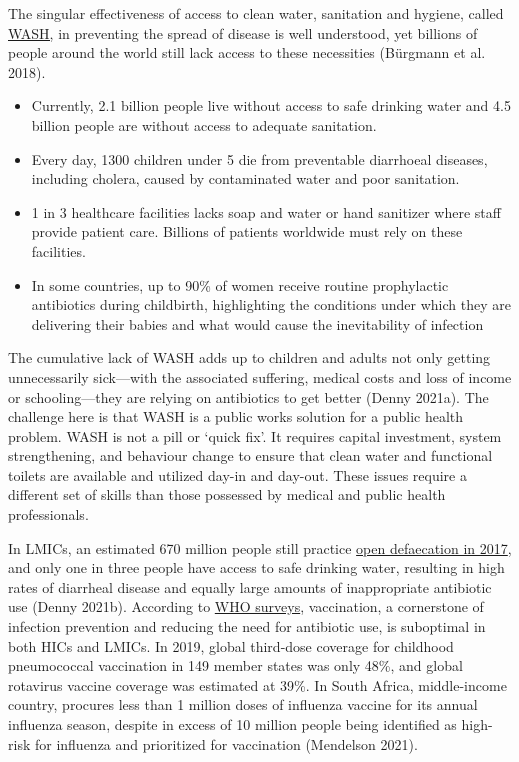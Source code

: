 \documentclass[]{tufte-handout}
\providecommand{\tightlist}{%
  \setlength{\itemsep}{0pt}\setlength{\parskip}{0pt}}
\begin{document}
The singular effectiveness of access to clean water, sanitation and
hygiene, called
\href{https://www.who.int/health-topics/water-sanitation-and-hygiene-wash}{WASH,}
in preventing the spread of disease is well understood, yet billions of
people around the world still lack access to these necessities (Bürgmann
et al. 2018).

\begin{itemize}
\tightlist
\item
  Currently, 2.1 billion people live without access to safe drinking
  water and 4.5 billion people are without access to adequate
  sanitation.
\item
  Every day, 1300 children under 5 die from preventable diarrhoeal
  diseases, including cholera, caused by contaminated water and poor
  sanitation.
\item
  1 in 3 healthcare facilities lacks soap and water or hand sanitizer
  where staff provide patient care. Billions of patients worldwide must
  rely on these facilities.
\item
  In some countries, up to 90\% of women receive routine prophylactic
  antibiotics during childbirth, highlighting the conditions under which
  they are delivering their babies and what would cause the
  inevitability of infection
\end{itemize}

The cumulative lack of WASH adds up to children and adults not only
getting unnecessarily sick---with the associated suffering, medical
costs and loss of income or schooling---they are relying on antibiotics
to get better (Denny 2021a). The challenge here is that WASH is a public
works solution for a public health problem. WASH is not a pill or `quick
fix'. It requires capital investment, system strengthening, and
behaviour change to ensure that clean water and functional toilets are
available and utilized day-in and day-out. These issues require a
different set of skills than those possessed by medical and public
health professionals.

In LMICs, an estimated 670 million people still practice
\href{https://blogs.worldbank.org/opendata/open-defeca\%20tion-nearly-halved-2000-still-practiced-670-million}{open
defaecation in 2017}, and only one in three people have access to safe
drinking water, resulting in high rates of diarrheal disease and equally
large amounts of inappropriate antibiotic use (Denny 2021b). According
to
\href{https://www.who.int/news-room/\%20fact-sheets/detail/immunization-coverage.}{WHO
surveys}, vaccination, a cornerstone of infection prevention and
reducing the need for antibiotic use, is suboptimal in both HICs and
LMICs. In 2019, global third-dose coverage for childhood pneumococcal
vaccination in 149 member states was only 48\%, and global rotavirus
vaccine coverage was estimated at 39\%. In South Africa, middle-income
country, procures less than 1 million doses of influenza vaccine for its
annual influenza season, despite in excess of 10 million people being
identified as high-risk for influenza and prioritized for vaccination
(Mendelson 2021).
\end{document}
